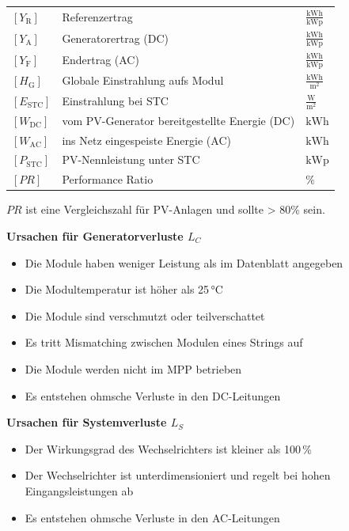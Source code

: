 \renewcommand{\arraystretch}{1.2}
\begin{tabular}{@{} l p{6.5cm} l @{}}
    $[Y_\mathrm{R}]$     & Referenzertrag \dotfill & $\frac{\mathrm{kWh}}{\mathrm{kWp}}$ \\
    $[Y_\mathrm{A}]$     & Generatorertrag (DC) \dotfill & $\frac{\mathrm{kWh}}{\mathrm{kWp}}$ \\
    $[Y_\mathrm{F}]$     & Endertrag (AC) \dotfill & $\frac{\mathrm{kWh}}{\mathrm{kWp}}$ \\
    $[H_\mathrm{G}]$     & Globale Einstrahlung aufs Modul \dotfill & $\frac{\mathrm{kWh}}{\mathrm{m^2}}$ \\
    $[E_\mathrm{STC}]$   & Einstrahlung bei STC \dotfill & $\frac{\mathrm{W}}{\mathrm{m^2}}$ \\
    $[W_\mathrm{DC}]$    & vom PV-Generator bereitgestellte Energie (DC) \dotfill & $\mathrm{kWh}$ \\
    $[W_\mathrm{AC}]$    & ins Netz eingespeiste Energie (AC) \dotfill & $\mathrm{kWh}$ \\
    $[P_\mathrm{STC}]$   & PV-Nennleistung unter STC \dotfill & $\mathrm{kWp}$ \\
    $[PR]$   & Performance Ratio \dotfill & $\%$ \\
\end{tabular}

$PR$ ist eine Vergleichszahl für PV-Anlagen und sollte > 80\% sein.

\vspace{0.1cm}

\textbf{Ursachen für Generatorverluste \( L_C \)}
\begin{itemize}
    \item Die Module haben weniger Leistung als im Datenblatt angegeben
    \item Die Modultemperatur ist höher als 25\,°C
    \item Die Module sind verschmutzt oder teilverschattet
    \item Es tritt Mismatching zwischen Modulen eines Strings auf
    \item Die Module werden nicht im MPP betrieben
    \item Es entstehen ohmsche Verluste in den DC-Leitungen
\end{itemize}

\vspace{1em}

\textbf{Ursachen für Systemverluste \( L_S \)}
\begin{itemize}
    \item Der Wirkungsgrad des Wechselrichters ist kleiner als 100\,\%
    \item Der Wechselrichter ist unterdimensioniert und regelt bei hohen Eingangsleistungen ab
    \item Es entstehen ohmsche Verluste in den AC-Leitungen
\end{itemize}








